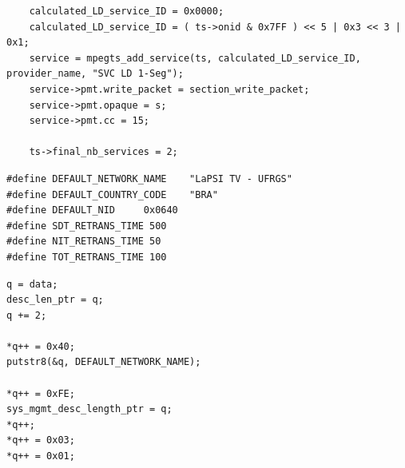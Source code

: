 \documentclass[
	12pt,				%
	openright,			%
	twoside,			%
	a4paper,			%
	brazil,
	french,				%
	english
	]{abntex2}
\begin{document}
\begin{apendicesenv}
\begin{lstlisting}
	calculated_LD_service_ID = 0x0000;
	calculated_LD_service_ID = ( ts->onid & 0x7FF ) << 5 | 0x3 << 3 | 0x1;
	service = mpegts_add_service(ts, calculated_LD_service_ID, provider_name, "SVC LD 1-Seg");
	service->pmt.write_packet = section_write_packet;
	service->pmt.opaque = s;
	service->pmt.cc = 15;
	
	ts->final_nb_services = 2;
\end{lstlisting}

\begin{lstlisting}[caption={Created macros.}, label={lst_macros}]
#define DEFAULT_NETWORK_NAME    "LaPSI TV - UFRGS"
#define DEFAULT_COUNTRY_CODE    "BRA"
#define DEFAULT_NID		0x0640
#define SDT_RETRANS_TIME 500
#define NIT_RETRANS_TIME 50
#define TOT_RETRANS_TIME 100
\end{lstlisting}

\begin{lstlisting}[caption={.}, label={lst_pointer_assignment}]
q = data;
desc_len_ptr = q;
q += 2;

*q++ = 0x40;
putstr8(&q, DEFAULT_NETWORK_NAME);

*q++ = 0xFE;
sys_mgmt_desc_length_ptr = q;
*q++;
*q++ = 0x03;
*q++ = 0x01;
\end{lstlisting}


\end{apendicesenv}


\end{document}

